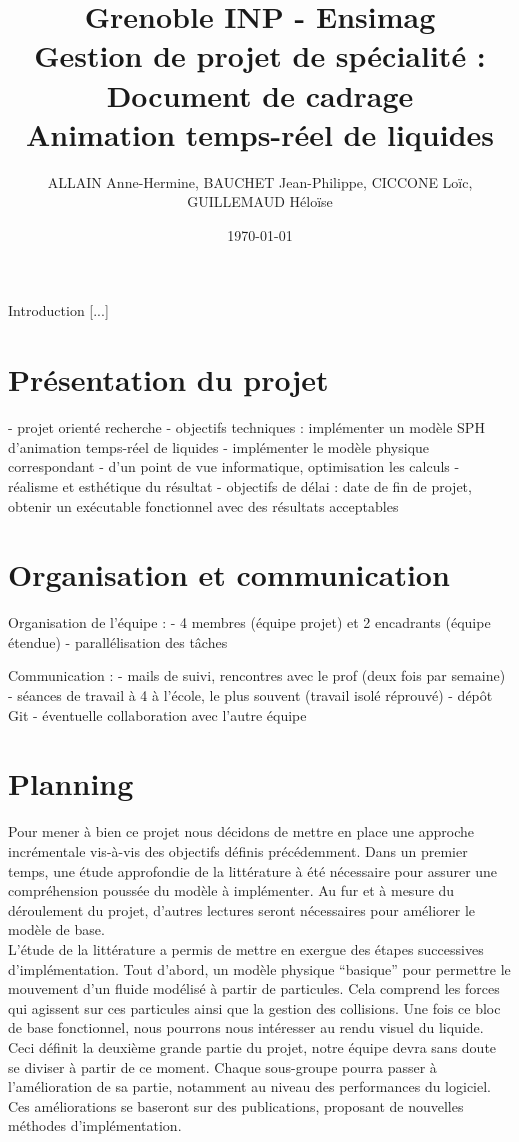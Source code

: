 \documentclass[a4paper,10pt]{article}
\title{Grenoble INP - Ensimag \\ Gestion de projet de spécialité : Document de cadrage \\ Animation temps-réel de liquides}
\author{ALLAIN Anne-Hermine, BAUCHET Jean-Philippe, CICCONE Loïc, GUILLEMAUD Héloïse}
\date{\today}
\begin{document}
\maketitle

Introduction [...]


\section{Présentation du projet}

- projet orienté recherche
- objectifs techniques : implémenter un modèle SPH d'animation temps-réel de liquides
	- implémenter le modèle physique correspondant
	- d'un point de vue informatique, optimisation les calculs
	- réalisme et esthétique du résultat
- objectifs de délai : date de fin de projet, obtenir un exécutable fonctionnel avec des résultats acceptables


\section{Organisation et communication}

Organisation de l'équipe :
- 4 membres (équipe projet) et 2 encadrants (équipe étendue)
- parallélisation des tâches

Communication :
- mails de suivi, rencontres avec le prof (deux fois par semaine)
- séances de travail à 4 à l'école, le plus souvent (travail isolé réprouvé)
- dépôt Git
- éventuelle collaboration avec l'autre équipe


\section{Planning}

Pour mener à bien ce projet nous décidons de mettre en place une approche incrémentale vis-à-vis des objectifs définis précédemment. Dans un premier temps, une étude approfondie de la littérature à été nécessaire pour assurer une compréhension poussée du modèle à implémenter. Au fur et à mesure du déroulement du projet, d'autres lectures seront nécessaires pour améliorer le modèle de base.\\

L'étude de la littérature a permis de mettre en exergue des étapes successives d'implémentation. Tout d'abord, un modèle physique ``basique'' pour permettre le mouvement d'un fluide modélisé à partir de particules. Cela comprend les forces qui agissent sur ces particules ainsi que la gestion des collisions. Une fois ce bloc de base fonctionnel, nous pourrons nous intéresser au rendu visuel du liquide. Ceci définit la deuxième grande partie du projet, notre équipe devra sans doute se diviser à partir de ce moment. Chaque sous-groupe pourra passer à l'amélioration de sa partie, notamment au niveau des performances du logiciel. Ces améliorations se baseront sur des publications, proposant de nouvelles méthodes d'implémentation.\\
\end{document}
